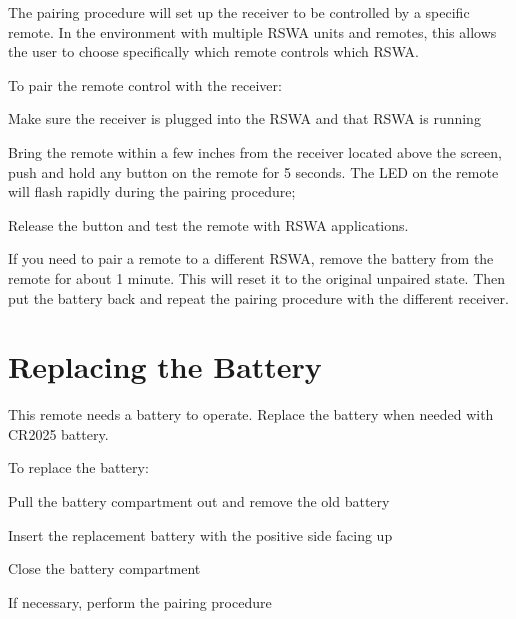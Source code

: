 The pairing procedure will set up the receiver to be controlled by a specific
remote. In the environment with multiple RSWA units and remotes, this allows the
user to choose specifically which remote controls which RSWA.

To pair the remote control with the receiver:

\startitemize
\item
Make sure the receiver is plugged into the RSWA and that RSWA is running
\item
Bring the remote within a few inches from the receiver located above the
screen, push and hold any button on the remote for 5 seconds. The LED on the
remote will flash rapidly during the pairing procedure;
\item
Release the button and test the remote with RSWA applications.
\stopitemize

If you need to pair a remote to a different RSWA, remove the battery from the
remote for about 1 minute. This will reset it to the original unpaired state.
Then put the battery back and repeat the pairing procedure with the different
receiver.

\section[replacing-the-battery]{Replacing the Battery}

This remote needs a battery to operate. Replace the battery when needed with CR2025 battery.


To replace the battery:

\startitemize
\item
Pull the battery compartment out and remove the old battery
\item
Insert the replacement battery with the positive side facing up
\item
Close the battery compartment
\item
If necessary, perform the pairing procedure
\stopitemize